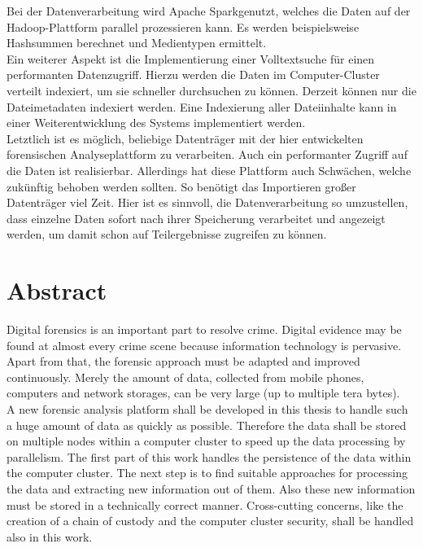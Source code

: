 \noindent
Bei der Datenverarbeitung wird Apache Spark\texttrademark\thinspace genutzt, welches die Daten auf der Hadoop-Plattform parallel prozessieren kann. Es werden beispielsweise Hashsummen berechnet und Medientypen ermittelt.\\
Ein weiterer Aspekt ist die Implementierung einer Volltextsuche für einen performanten Datenzugriff. Hierzu werden die Daten im Computer-Cluster verteilt indexiert, um sie schneller durchsuchen zu können. Derzeit können nur die Dateimetadaten indexiert werden. Eine Indexierung aller Dateiinhalte kann in einer Weiterentwicklung des Systems implementiert werden.\\

\noindent
Letztlich ist es möglich, beliebige Datenträger mit der hier entwickelten forensischen Analyseplattform zu verarbeiten. Auch ein performanter Zugriff auf die Daten ist realisierbar. Allerdings hat diese Plattform auch Schwächen, welche zukünftig behoben werden sollten. So benötigt das Importieren großer Datenträger viel Zeit. Hier ist es sinnvoll, die Datenverarbeitung so umzustellen, dass einzelne Daten sofort nach ihrer Speicherung verarbeitet und angezeigt werden, um damit schon auf Teilergebnisse zugreifen zu können.


\newpage
\section*{Abstract}
Digital forensics is an important part to resolve crime. Digital evidence may be found at almost every crime scene because information technology is pervasive. Apart from that, the forensic approach must be adapted and improved continuously. Merely the amount of data, collected from mobile phones, computers and network storages, can be very large (up to multiple tera bytes).\\

\noindent
A new forensic analysis platform shall be developed in this thesis to handle such a huge amount of data as quickly as possible. Therefore the data shall be stored on multiple nodes within a computer cluster to speed up the data processing by parallelism. The first part of this work handles the persistence of the data within the computer cluster. The next step is to find suitable approaches for processing the data and extracting new information out of them. Also these new information must be stored in a technically correct manner. Cross-cutting concerns, like the creation of a chain of custody and the computer cluster security, shall be handled also in this work.\\

